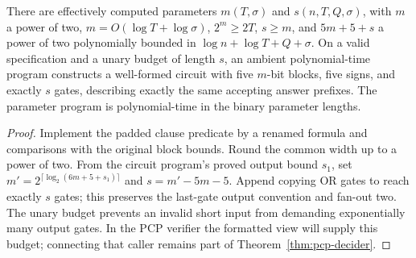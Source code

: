\begin{proposition}
\label{prop:pcp-padded-describer}
\leanok
There are effectively computed parameters $m(T,\sigma)$ and $s(n,T,Q,\sigma)$,
with $m$ a power of two, $m=O(\log T+\log\sigma)$, $2^m\geq 2T$, $s\geq m$,
and $5m+5+s$ a power of two polynomially bounded in
$\log n+\log T+Q+\sigma$. On a valid specification and a unary budget of
length $s$, an ambient polynomial-time program constructs a well-formed circuit
with five $m$-bit blocks, five signs, and exactly $s$ gates, describing exactly
the same accepting answer prefixes. The parameter program is polynomial-time
in the binary parameter lengths.
\end{proposition}
\begin{proof}
\leanok
Implement the padded clause predicate by a renamed formula and comparisons
with the original block bounds. Round the common width up to a power of two.
From the circuit program's proved output bound $s_1$, set
$m'=2^{\lceil\log_2(6m+5+s_1)\rceil}$ and $s=m'-5m-5$.
Append copying OR gates to reach exactly $s$ gates; this preserves the last-gate
output convention and fan-out two. The unary budget prevents an invalid short
input from demanding exponentially many output gates. In the PCP verifier the
formatted view will supply this budget; connecting that caller remains part
of Theorem~\ref{thm:pcp-decider}.
\end{proof}

